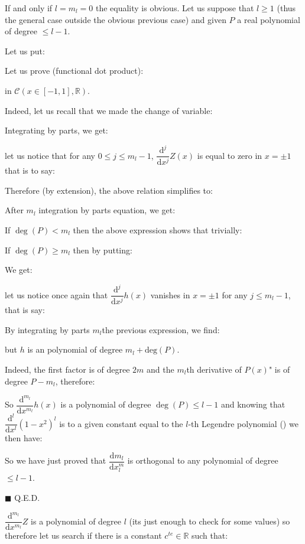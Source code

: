	\begin{dem}
	If and only if $l=m_l=0$ the equality is obvious. Let us suppose that $l\geq 1$ (thus the general case outside the obvious previous case) and given $P$ a real polynomial of degree $\leq l-1$.

	Let us put:
	
	Let us prove (functional dot product):
	
	in  $\mathcal{C}(x\in[-1,1],\mathbb{R})$.
	
	Indeed, let us recall that we made the change of variable:
	
	Integrating by parts, we get:
	
	let us notice that for any $0\leq j\leq m_l-1$, $\dfrac{\mathrm{d}^j}{\mathrm{d}x^j}Z(x)$ is equal to zero in $x=\pm 1$ that is to say:
	
	Therefore (by extension), the above relation simplifies to:
	
	After $m_l$ integration by parts equation, we get:
	
	If $\deg(P)<m_l$ then the above expression shows that trivially:
	
	If $\deg(P)\geq m_l$ then by putting:
	
	We get:
	
	let us notice once again that $\dfrac{\mathrm{d}^j}{\mathrm{d}x^j}h(x)$ vanishes in $x=\pm 1$ for any $j\leq m_l-1$, that is say:
	
	By integrating by parts $m_l$the previous expression, we find:
	
	but $h$ is an polynomial of degree $m_l+\text{deg}(P)$.
	
	Indeed, the first factor is of degree $2m$ and the $m_l$th derivative of $P(x)$" is of degree $P-m_l$, therefore:
	
	So $\dfrac{\mathrm{d}^{m_l}}{\mathrm{d}x^{m_l}}h(x)$ is a polynomial of degree $\deg(P)\leq l-1$ and knowing that $\dfrac{\mathrm{d}^l}{\mathrm{d}x^l}(1-x^2)^l$ is to a given constant equal to the $l$-th Legendre polynomial () we then have:
	
	So we have just proved that $\dfrac{\mathrm{d}m_l}{\mathrm{d}x^{m}_l}$ is orthogonal to any polynomial of degree $\leq l-1$.
	\begin{flushright}
		$\blacksquare$  Q.E.D.
	\end{flushright}
	\end{dem}
	$\dfrac{\mathrm{d}^{m_l}}{\mathrm{d}x^{m_l}}Z$ is a polynomial of degree $l$ (its just enough to check for some values) so therefore let us search if there is a constant $c^{te}\in\mathbb{R}$ such that:
	
